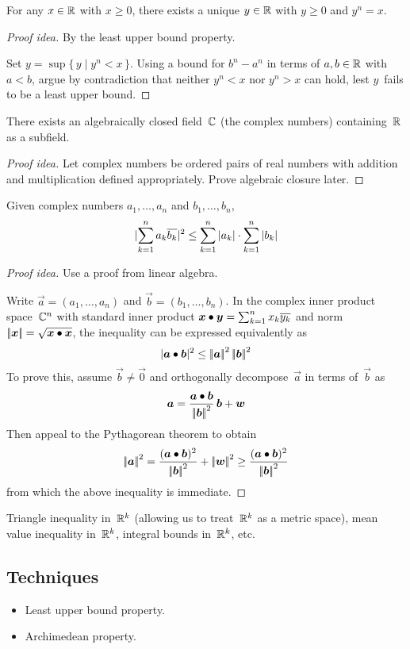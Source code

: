 \begin{thm}[\(n\)-th roots in~\(\R\)]
For any \(x\in\mathbb{R}\) with \(x\ge0\), there exists a unique \(y\in\mathbb{R}\) with \(y\ge0\) and \(y^n=x\).
\end{thm}
\begin{proof}[Proof idea]
By the least upper bound property.

Set \(y=\sup\{\,y\mid y^n<x\,\}\). Using a bound for \(b^n-a^n\) in terms of \(a,b\in\mathbb{R}\) with \(a<b\), argue by contradiction that neither \(y^n<x\) nor \(y^n>x\) can hold, lest \(y\)~fails to be a least upper bound.
\end{proof}

\begin{thm}[Existence of~\(\C\)]
There exists an algebraically closed field~\(\C\) (the complex numbers) containing~\(\R\) as a subfield.
\end{thm}
\begin{proof}[Proof idea]
Let complex numbers be ordered pairs of real numbers with addition and multiplication defined appropriately. Prove algebraic closure later.
\end{proof}

\begin{thm}
Given complex numbers \(a_1,\ldots,a_n\) and \(b_1,\ldots,b_n\),
\[|{\sum_{k=1}^n a_k\overline{b_k}}|^2\le\sum_{k=1}^n|{a_k}|\cdot\sum_{k=1}^n|{b_k}|\]
\end{thm}
\begin{proof}[Proof idea]
Use a proof from linear algebra.

Write \(\vec{a}=(a_1,\ldots,a_n)\) and \(\vec{b}=(b_1,\ldots,b_n)\). In the complex inner product space~\(\mathbb{C}^n\) with standard inner product \(\boldsymbol{x}\bullet\boldsymbol{y}=\sum_{k=1}^n x_k\overline{y_k}\) and norm \(\left|\!\left|{\boldsymbol{x}}\right|\!\right|=\sqrt{\boldsymbol{x}\bullet\boldsymbol{x}}\), the inequality can be expressed equivalently as
\[|{\boldsymbol{a}\bullet\boldsymbol{b}}|^2\le\left|\!\left|{\boldsymbol{a}}\right|\!\right|^2\left|\!\left|{\boldsymbol{b}}\right|\!\right|^2\]
To prove this, assume \(\vec{b}\ne\vec{0}\) and orthogonally decompose~\(\vec{a}\) in terms of~\(\vec{b}\) as
\[\boldsymbol{a}=\frac{\boldsymbol{a}\bullet\boldsymbol{b}}{\left|\!\left|{\boldsymbol{b}}\right|\!\right|^2}\,\boldsymbol{b}+\boldsymbol{w}\]
Then appeal to the Pythagorean theorem to obtain
\[\norm{\vec{a}}^2=\frac{(\vec{a}\dotprod\vec{b})^2}{\norm{\vec{b}}^2}+\norm{\vec{w}}^2\ge\frac{(\vec{a}\dotprod\vec{b})^2}{\norm{\vec{b}}^2}\]
from which the above inequality is immediate.
\end{proof}
\begin{app}
Triangle inequality in~\(\mathbb{R}^k\) (allowing us to treat~\(\mathbb{R}^k\) as a metric space), mean value inequality in~\(\mathbb{R}^k\), integral bounds in~\(\mathbb{R}^k\), etc.
\end{app}
\subsection*{Techniques}
\begin{itemize}[itemsep=0pt]
\item Least upper bound property.
\item Archimedean property.
\end{itemize}

